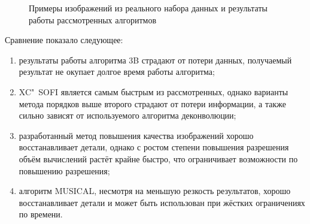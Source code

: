 \begin{figure}[ht]
	\caption{Примеры изображений из реального набора данных и результаты работы рассмотренных алгоритмов}
	\label{fig:blinking-results-real}
\end{figure}

Сравнение показало следующее:

\begin{enumerate}[beginpenalty=10000]
	\item результаты работы алгоритма 3B страдают от потери данных, получаемый результат не окупает долгое время работы алгоритма;
	\item XC"~SOFI является самым быстрым из рассмотренных, однако варианты метода порядков выше второго страдают от потери информации, а также сильно зависят от используемого алгоритма деконволюции;
	\item разработанный метод повышения качества изображений хорошо восстанавливает детали, однако с ростом степени повышения разрешения объём вычислений растёт крайне быстро, что ограничивает возможности по повышению разрешения;
	\item алгоритм MUSICAL, несмотря на меньшую резкость результатов, хорошо восстанавливает детали и может быть использован при жёстких ограничениях по времени.
\end{enumerate}

